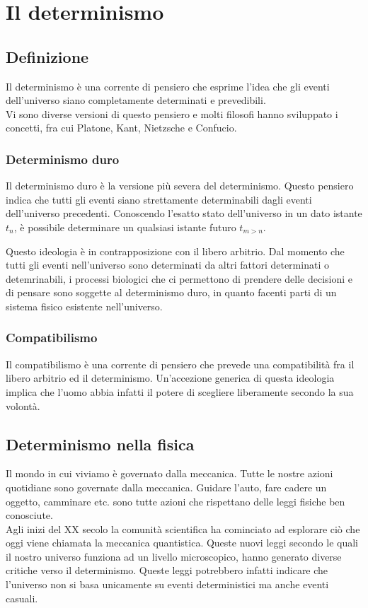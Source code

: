 \documentclass[a4paper, 12pt]{article}
\begin{document}
 \section{Il determinismo}

\subsection{Definizione}

Il determinismo è una corrente di pensiero che esprime l'idea
che gli eventi dell'universo siano completamente determinati e prevedibili.
\\
Vi sono diverse versioni di questo pensiero e
molti filosofi hanno sviluppato i concetti, fra cui Platone, Kant,
Nietzsche e Confucio.

\subsubsection{Determinismo duro}

Il determinismo duro è la versione più severa del determinismo.
Questo pensiero indica che tutti gli eventi siano strettamente
determinabili dagli eventi dell'universo precedenti.
Conoscendo l'esatto stato dell'universo in un dato istante \(t_n\), è possibile
determinare un qualsiasi istante futuro \(t_{m > n}\).

Questo ideologia è in contrapposizione con il libero arbitrio.
Dal momento che tutti gli eventi nell'universo sono determinati da altri fattori determinati
o detemrinabili, i processi biologici che ci permettono di prendere delle decisioni e di pensare
sono soggette al determinismo duro, in quanto facenti parti di un sistema fisico esistente nell'universo.

\subsubsection{Compatibilismo}

Il compatibilismo è una corrente di pensiero che prevede una compatibilità
fra il libero arbitrio ed il determinismo. Un'accezione generica di questa ideologia
implica che l'uomo abbia infatti il potere di scegliere liberamente secondo la sua volontà.

\subsection{Determinismo nella fisica}

Il mondo in cui viviamo è governato dalla meccanica.
Tutte le nostre azioni quotidiane sono governate dalla meccanica.
Guidare l'auto, fare cadere un oggetto, camminare etc. sono tutte azioni
che rispettano delle leggi fisiche ben conosciute. \\
Agli inizi del XX secolo la comunità scientifica ha cominciato ad esplorare ciò che
oggi viene chiamata la meccanica quantistica. Queste nuovi leggi secondo le quali il nostro universo funziona
ad un livello microscopico, hanno generato diverse critiche verso il determinismo.
Queste leggi potrebbero infatti indicare che l'universo non si basa unicamente su eventi deterministici ma anche eventi casuali.
\end{document}
